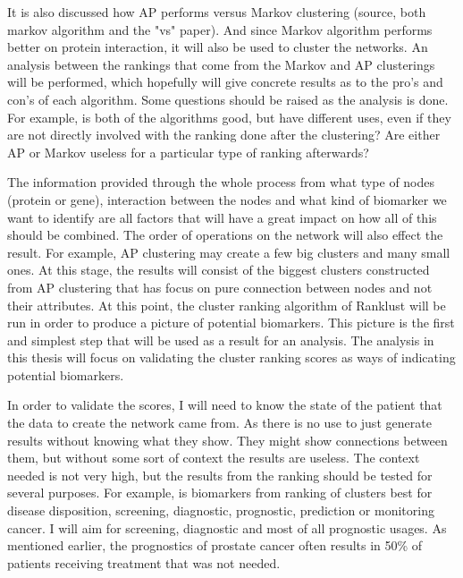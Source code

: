 It is also discussed how AP performs versus Markov clustering (source, both
markov algorithm and the "vs" paper). And since Markov algorithm performs better
on protein interaction, it will also be used to cluster the networks. An
analysis between the rankings that come from the Markov and AP clusterings will
be performed, which hopefully will give concrete results as to the pro's and
con's of each algorithm. Some questions should be raised as the analysis is
done. For example, is both of the algorithms good, but have different uses, even
if they are not directly involved with the ranking done after the clustering?
Are either AP or Markov useless for a particular type of ranking afterwards?

The information provided through the whole process from what type of nodes
(protein or gene), interaction between the nodes and what kind of biomarker we
want to identify are all factors that will have a great impact on how all of
this should be combined. The order of operations on the network will also effect
the result. For example, AP clustering may create a few big clusters and many
small ones. At this stage, the results will consist of the biggest clusters
constructed from AP clustering that has focus on pure connection between nodes
and not their attributes. At this point, the cluster ranking algorithm of
Ranklust will be run in order to produce a picture of potential biomarkers. This
picture is the first and simplest step that will be used as a result for an
analysis. The analysis in this thesis will focus on validating the cluster
ranking scores as ways of indicating potential biomarkers. 

In order to validate the scores, I will need to know the state of the patient
that the data to create the network came from. As there is no use to just
generate results without knowing what they show. They might show connections
between them, but without some sort of context the results are useless. The
context needed is not very high, but the results from the ranking should be
tested for several purposes. For example, is biomarkers from ranking of clusters
best for disease disposition, screening, diagnostic, prognostic, prediction or
monitoring cancer. I will aim for screening, diagnostic and most of all
prognostic usages. As mentioned earlier, the prognostics of prostate cancer
often results in 50\% of patients receiving treatment that was not needed.

